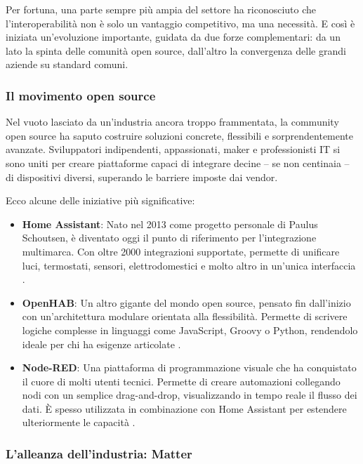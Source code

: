 Per fortuna, una parte sempre più ampia del settore ha riconosciuto che l’interoperabilità non è solo un vantaggio competitivo, ma una necessità. E così è iniziata un’evoluzione importante, guidata da due forze complementari: da un lato la spinta delle comunità open source, dall’altro la convergenza delle grandi aziende su standard comuni.

\subsubsection{Il movimento open source}

Nel vuoto lasciato da un’industria ancora troppo frammentata, la community open source ha saputo costruire soluzioni concrete, flessibili e sorprendentemente avanzate. Sviluppatori indipendenti, appassionati, maker e professionisti IT si sono uniti per creare piattaforme capaci di integrare decine – se non centinaia – di dispositivi diversi, superando le barriere imposte dai vendor.

Ecco alcune delle iniziative più significative:

\begin{itemize}
    \item \textbf{Home Assistant}: Nato nel 2013 come progetto personale di Paulus Schoutsen, è diventato oggi il punto di riferimento per l’integrazione multimarca. Con oltre 2000 integrazioni supportate, permette di unificare luci, termostati, sensori, elettrodomestici e molto altro in un’unica interfaccia \cite{HomeAssistant2024}.

    \item \textbf{OpenHAB}: Un altro gigante del mondo open source, pensato fin dall’inizio con un’architettura modulare orientata alla flessibilità. Permette di scrivere logiche complesse in linguaggi come JavaScript, Groovy o Python, rendendolo ideale per chi ha esigenze articolate \cite{OpenHAB2023}.

    \item \textbf{Node-RED}: Una piattaforma di programmazione visuale che ha conquistato il cuore di molti utenti tecnici. Permette di creare automazioni collegando nodi con un semplice drag-and-drop, visualizzando in tempo reale il flusso dei dati. È spesso utilizzata in combinazione con Home Assistant per estendere ulteriormente le capacità \cite{NodeRED2024}.
\end{itemize}

\subsubsection{L'alleanza dell'industria: Matter}

